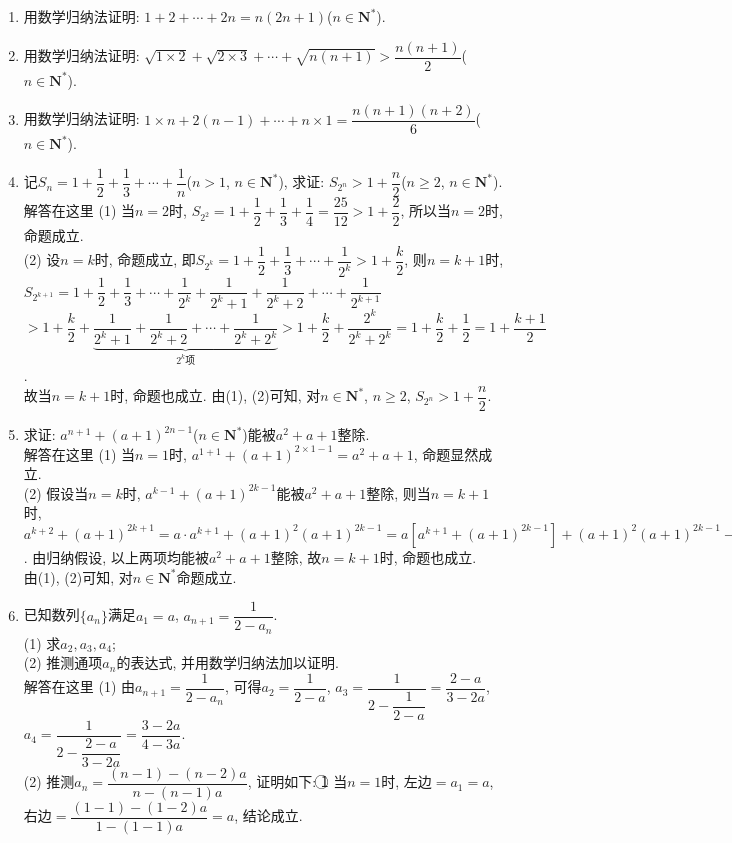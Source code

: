 \documentclass[10pt,a4paper]{article}
\begin{document}
\begin{enumerate}[1.]
\item 用数学归纳法证明: $1+2+\cdots +2n=n(2n+1)$($n\in \mathbf{N}^*$).
\item 用数学归纳法证明: $\sqrt {1\times 2}+\sqrt {2\times 3}+\cdots +\sqrt {n(n+1)}>\dfrac{n(n+1)}2$($n\in \mathbf{N}^*$). 
\item 用数学归纳法证明: $1\times n+2(n-1)+\cdots +n\times 1=\dfrac{n(n+1)(n+2)}6$($n\in \mathbf{N}^*$).
\item 记$S_n=1+\dfrac 12+\dfrac 13+\cdots +\dfrac 1n$($n>1$, $n\in \mathbf{N}^*$), 求证: $S_{2^n}>1+\dfrac n2$($n\ge 2$, $n\in \mathbf{N}^*$).\\
解答在这里  (1) 当$n=2$时, $S_{2^2}=1+\dfrac 12+\dfrac 13+\dfrac 14=\dfrac{25}{12}>1+\dfrac 22$, 所以当$n=2$时, 命题成立.\\
(2) 设$n=k$时, 命题成立, 即$S_{2^k}=1+\dfrac 12+\dfrac 13+\cdots +\dfrac 1{2^k}>1+\dfrac k2$,
则$n=k+1$时,
$S_{2^{k+1}}=1+\dfrac 12+\dfrac 13+\cdots +\dfrac 1{2^k}+\dfrac 1{2^k+1}+\dfrac 1{2^k+2}+\cdots +\dfrac 1{2^{k+1}}$
$>1+\dfrac k2+\underbrace{\dfrac 1{2^k+1}+\dfrac 1{2^k+2}+\cdots +\dfrac 1{2^k+2^k}}_{2^k\text{项}}>1+\dfrac k2+\dfrac{2^k}{{2^k}+{2^k}}=1+\dfrac k2+\dfrac 12=1+\dfrac{k+1}2$.\\
故当$n=k+1$时, 命题也成立.
由(1), (2)可知, 对$n\in \mathbf{N}^*$, $n\ge 2$, $S_{2^n}>1+\dfrac n2$.
\item 求证: $a^{n+1}+(a+1)^{2n-1}$($n\in \mathbf{N}^*$)能被$a^2+a+1$整除.\\
解答在这里  (1) 当$n=1$时, $a^{1+1}+(a+1)^{2\times 1-1}=a^2+a+1$, 命题显然成立.\\
(2) 假设当$n=k$时, $a^{k-1}+(a+1)^{2k-1}$能被$a^2+a+1$整除, 则当$n=k+1$时,$a^{k+2}+(a+1)^{2k+1}=a\cdot a^{k+1}+(a+1)^2(a+1)^{2k-1}=a[a^{k+1}+(a+1)^{2k-1}]+(a+1)^2(a+1)^{2k-1}-a(a+1)^{2k-1}=a[a^{k+1}+(a+1)^{2k-1}]+(a^2+a+1)(a+1)^{2k-1}$. 由归纳假设, 以上两项均能被$a^2+a+1$整除, 故$n=k+1$时, 命题也成立.\\
由(1), (2)可知, 对$n\in \mathbf{N}^*$命题成立.
\item 已知数列$\{a_n\}$满足$a_1=a$, $a_{n+1}=\dfrac 1{2-a_n}$.\\
(1) 求$a_2,a_3,a_4$;\\
(2) 推测通项$a_n$的表达式, 并用数学归纳法加以证明.\\
解答在这里  (1) 由$a_{n+1}=\dfrac 1{2-a_n}$, 可得$a_2=\dfrac 1{2-a}$, $a_3=\dfrac 1{2-\dfrac 1{2-a}}=\dfrac{2-a}{3-2a}$, $a_4=\dfrac 1{2-\dfrac{2-a}{3-2a}}=\dfrac{3-2a}{4-3a}$.\\
(2) 推测$a_n=\dfrac{(n-1)-(n-2)a}{n-(n-1)a}$, 证明如下:
\textcircled{1} 当$n=1$时, 左边$=a_1=a$, 右边$=\dfrac{(1-1)-(1-2)a}{1-(1-1)a}=a$, 结论成立.

\end{enumerate}
\end{document}
